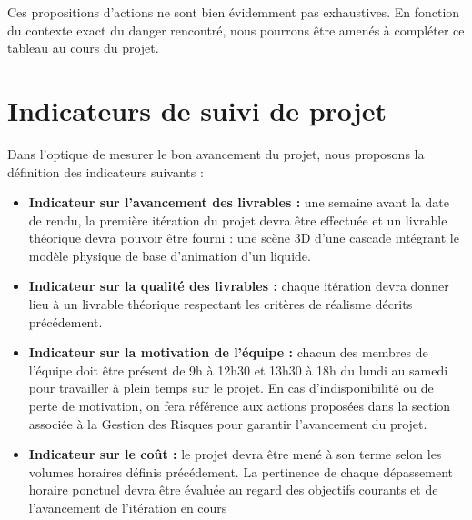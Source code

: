 \documentclass[a4paper,11pt]{article}
\begin{document}
Ces propositions d'actions ne sont bien évidemment pas exhaustives. En fonction du contexte exact du danger rencontré, nous pourrons être amenés à compléter ce tableau au cours du projet.

\section{Indicateurs de suivi de projet}

Dans l'optique de mesurer le bon avancement du projet, nous proposons la définition des indicateurs suivants :
\begin{itemize}
\item \textbf{Indicateur sur l'avancement des livrables : } une semaine avant la date de rendu, la première itération du projet devra être effectuée et un livrable théorique devra pouvoir être fourni : une scène 3D d'une cascade intégrant le modèle physique de base d'animation d'un liquide. 
\item \textbf{Indicateur sur la qualité des livrables : } chaque itération devra donner lieu à un livrable théorique respectant les critères de réalisme décrits précédement.
\item \textbf{Indicateur sur la motivation de l'équipe : } chacun des membres de l'équipe doit être présent de 9h à 12h30 et 13h30 à 18h du lundi au samedi pour travailler à plein temps sur le projet. En cas d'indisponibilité ou de perte de motivation, on fera référence aux actions proposées dans la section associée à la Gestion des Risques pour garantir l'avancement du projet.
\item \textbf{Indicateur sur le coût : } le projet devra être mené à son terme selon les volumes horaires définis précédement. La pertinence de chaque dépassement horaire ponctuel devra être évaluée au regard des objectifs courants et de l'avancement de l'itération en cours

\end{itemize}
\end{document}
